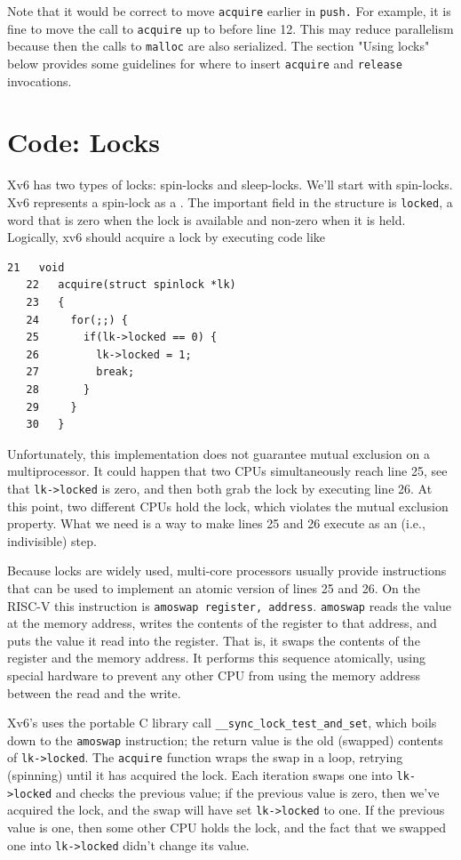 Note that it would be correct to move
\lstinline{acquire}
earlier in
\lstinline{push.}
For example, it is fine to move the call to
\lstinline{acquire}
up to before line 12.
This may reduce parallelism because then the calls
to
\lstinline{malloc}
are also serialized.
The section "Using locks" below provides some guidelines for where to insert
\lstinline{acquire}
and
\lstinline{release}
invocations.
\section{Code: Locks}
Xv6 has two types of locks: spin-locks and sleep-locks.
We'll start with spin-locks.
Xv6 represents a spin-lock as a
.
The important field in the structure is
\lstinline{locked},
a word that is zero when the lock is available
and non-zero when it is held.
Logically, xv6 should acquire a lock by executing code like
\begin{lstlisting}[]
   21	void
   22	acquire(struct spinlock *lk)
   23	{
   24	  for(;;) {
   25	    if(lk->locked == 0) {
   26	      lk->locked = 1;
   27	      break;
   28	    }
   29	  }
   30	}
\end{lstlisting}
Unfortunately, this implementation does not
guarantee mutual exclusion on a multiprocessor.
It could happen that two CPUs simultaneously
reach line 25, see that 
\lstinline{lk->locked}
is zero, and then both grab the lock by executing line 26.
At this point, two different CPUs hold the lock,
which violates the mutual exclusion property.
What we need is a way to
make lines 25 and 26 execute as an
(i.e., indivisible) step.

Because locks are widely used,
multi-core processors usually provide instructions that
can be used to implement an atomic version of
lines 25 and 26.
On the RISC-V this instruction is
\lstinline{amoswap register, address}.
\lstinline{amoswap}
reads the value at the memory address,
writes the contents of the register to that address,
and puts the value it read into the register.
That is, it swaps the contents of the register and the memory address.
It performs this sequence atomically, using special
hardware to prevent any
other CPU from using the memory address between the read and the write.

Xv6's 
uses the portable C library call 
\lstinline{__sync_lock_test_and_set},
which boils down to the
\lstinline{amoswap}
instruction;
the return value is the old (swapped) contents of
\lstinline{lk->locked}.
The
\lstinline{acquire}
function wraps the swap in a loop, retrying (spinning) until it has
acquired the lock.
Each iteration swaps one into
\lstinline{lk->locked} 
and checks the previous value;
if the previous value is zero, then we've acquired the
lock, and the swap will have set 
\lstinline{lk->locked}
to one.
If the previous value is one, then some other CPU
holds the lock, and the fact that we swapped one into
\lstinline{lk->locked}
didn't change its value.

